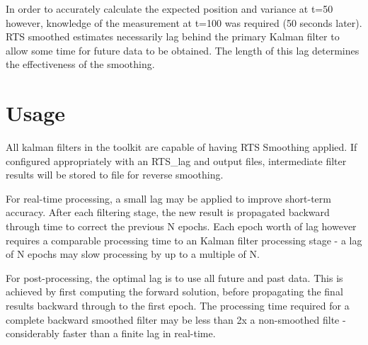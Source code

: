 In order to accurately calculate the expected position and variance at t=50 however, knowledge of the measurement at t=100 was required (50 seconds later). RTS smoothed estimates necessarily lag behind the primary Kalman filter to allow some time for future data to be obtained. The length of this lag determines the effectiveness of the smoothing.

\section{Usage}

All kalman filters in the toolkit are capable of having RTS Smoothing applied. If configured appropriately with an RTS\_lag and output files, intermediate filter results will be stored to file for reverse smoothing.

For real-time processing, a small lag may be applied to improve short-term accuracy. After each filtering stage, the new result is propagated backward through time to correct the previous N epochs. Each epoch worth of lag however requires a comparable processing time to an Kalman filter processing stage - a lag of N epochs may slow processing by up to a multiple of N.

For post-processing, the optimal lag is to use all future and past data. This is achieved by first computing the forward solution, before propagating the final results backward through to the first epoch. The processing time required for a complete backward smoothed filter may be less than 2x a non-smoothed filte - considerably faster than a finite lag in real-time.